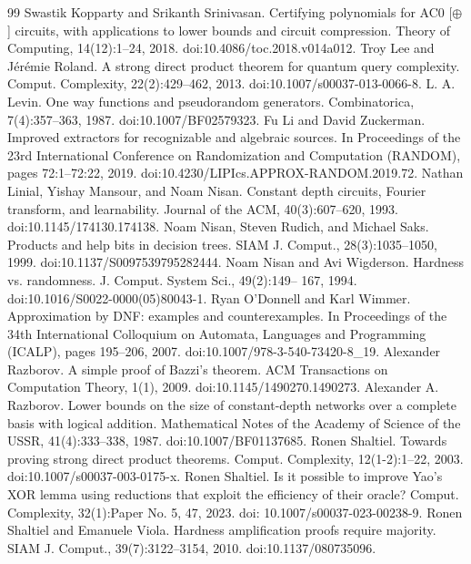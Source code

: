 \documentclass[10pt,a4paper]{article}
\begin{document}
\begin{thebibliography}{99}
 Swastik Kopparty and Srikanth Srinivasan. Certifying polynomials for AC0 [$\oplus$] circuits, with applications to lower bounds and circuit compression. Theory of Computing, 14(12):1–24, 2018. doi:10.4086/toc.2018.v014a012.
 Troy Lee and Jérémie Roland. A strong direct product theorem for quantum query complexity. Comput. Complexity, 22(2):429–462, 2013. doi:10.1007/s00037-013-0066-8.
 L. A. Levin. One way functions and pseudorandom generators. Combinatorica, 7(4):357–363, 1987. doi:10.1007/BF02579323.
 Fu Li and David Zuckerman. Improved extractors for recognizable and algebraic sources. In Proceedings of the 23rd International Conference on Randomization and Computation (RANDOM), pages 72:1–72:22, 2019. doi:10.4230/LIPIcs.APPROX-RANDOM.2019.72.
 Nathan Linial, Yishay Mansour, and Noam Nisan. Constant depth circuits, Fourier transform, and learnability. Journal of the ACM, 40(3):607–620, 1993. doi:10.1145/174130.174138.
 Noam Nisan, Steven Rudich, and Michael Saks. Products and help bits in decision trees. SIAM J. Comput., 28(3):1035–1050, 1999. doi:10.1137/S0097539795282444.
 Noam Nisan and Avi Wigderson. Hardness vs. randomness. J. Comput. System Sci., 49(2):149– 167, 1994. doi:10.1016/S0022-0000(05)80043-1.
 Ryan O’Donnell and Karl Wimmer. Approximation by DNF: examples and counterexamples. In Proceedings of the 34th International Colloquium on Automata, Languages and Programming (ICALP), pages 195–206, 2007. doi:10.1007/978-3-540-73420-8\_19.
 Alexander Razborov. A simple proof of Bazzi’s theorem. ACM Transactions on Computation Theory, 1(1), 2009. doi:10.1145/1490270.1490273.       
 Alexander A. Razborov. Lower bounds on the size of constant-depth networks over a complete basis with logical addition. Mathematical Notes of the Academy of Science of the USSR, 41(4):333–338, 1987. doi:10.1007/BF01137685.
 Ronen Shaltiel. Towards proving strong direct product theorems. Comput. Complexity, 12(1-2):1–22, 2003. doi:10.1007/s00037-003-0175-x.
 Ronen Shaltiel. Is it possible to improve Yao’s XOR lemma using reductions that exploit the efficiency of their oracle? Comput. Complexity, 32(1):Paper No. 5, 47, 2023. doi: 10.1007/s00037-023-00238-9.
 Ronen Shaltiel and Emanuele Viola. Hardness amplification proofs require majority. SIAM J. Comput., 39(7):3122–3154, 2010. doi:10.1137/080735096.

\end{thebibliography}
\end{document}
